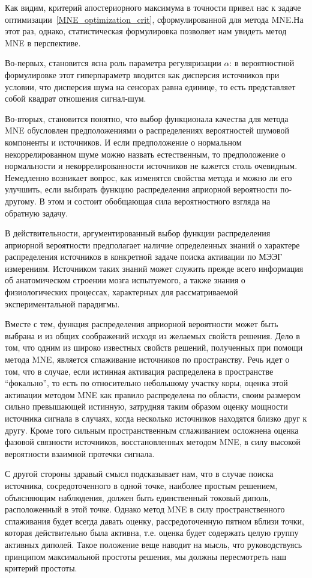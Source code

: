 Как видим, критерий апостериорного максимума в точности привел нас
к задаче оптимизации~\ref{MNE_optimization_crit}, сформулированной для
метода MNE.\@ На этот раз, однако, статистическая формулировка позволяет
нам увидеть метод MNE в перспективе.

Во-первых, становится ясна роль параметра регуляризации $\alpha$:
в вероятностной формулировке этот гиперпараметр вводится как дисперсия
источников при условии, что дисперсия шума на сенсорах равна единице,
то есть представляет собой квадрат отношения сигнал-шум.

Во-вторых, становится понятно, что выбор функционала качества для метода MNE
обусловлен предположениями о распределениях вероятностей шумовой компоненты и
источников. И если предположение о нормальном некоррелированном шуме можно
назвать естественным, то предположение о нормальности и некоррелированности
источников не кажется столь очевидным.  Немедленно возникает вопрос, как
изменятся свойства метода и можно ли его улучшить, если выбирать функцию
распределения априорной вероятности по-другому. В этом и состоит обобщающая
сила вероятностного взгляда на обратную задачу.

В действительности, аргументированный выбор функции распределения априорной
вероятности предполагает наличие определенных знаний о характере распределения
источников в конкретной задаче поиска активации по МЭЭГ измерениям. Источником
таких знаний может служить прежде всего информация об анатомическом строении
мозга испытуемого, а также знания о физиологических процессах, характерных для
рассматриваемой экспериментальной парадигмы.

Вместе с тем, функция распределения априорной вероятности может быть выбрана и из
общих соображений исходя из желаемых свойств решения. Дело в том, что одним из
широко известных свойств решений, полученных при помощи метода MNE, является
сглаживание источников по пространству. Речь идет о том, что в случае,
если истинная активация распределена в пространстве ``фокально'', то есть
по относительно небольшому участку коры, оценка этой активации методом
MNE как правило распределена по области, своим размером сильно превышающей
истинную, затрудняя таким образом оценку мощности источника сигнала в
случаях, когда несколько источников находятся близко друг к другу.
Кроме того сильным пространственным сглаживанием осложнена оценка фазовой
связности источников, восстановленных методом MNE, в силу высокой вероятности
взаимной протечки сигнала.

С другой стороны здравый смысл подсказывает нам, что в случае поиска источника,
сосредоточенного в одной точке, наиболее простым решением, объясняющим
наблюдения, должен быть единственный токовый диполь, расположенный в этой
точке. Однако метод MNE в силу пространственного сглаживания будет всегда
давать оценку, рассредоточенную пятном вблизи точки, которая действительно была
активна, т.е. оценка будет содержать целую группу активных диполей.
Такое положение веще наводит на мысль, что руководствуясь принципом
максимальной простоты решения, мы должны пересмотреть наш критерий простоты.

